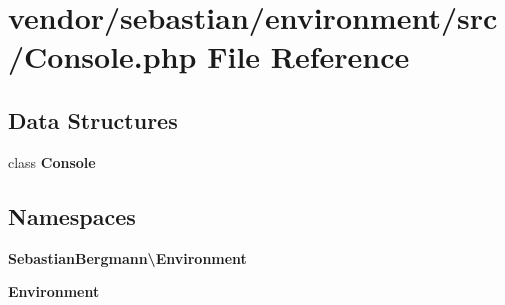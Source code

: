 \section{vendor/sebastian/environment/src/\+Console.php File Reference}
\label{_console_8php}
\subsection*{Data Structures}
\begin{DoxyCompactItemize}
\item 
class {\bf Console}
\end{DoxyCompactItemize}
\subsection*{Namespaces}
\begin{DoxyCompactItemize}
\item 
 {\bf Sebastian\+Bergmann\textbackslash{}\+Environment}
\item 
 {\bf Environment}
\end{DoxyCompactItemize}

